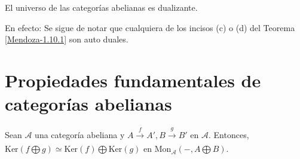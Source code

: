 \documentclass[tesis]{subfiles}
\begin{document}
\begin{Obs}\label{Mendoza-Ejer.48}
    El universo de las categorías abelianas es dualizante.
    \vspace{1mm}

    En efecto: Se sigue de notar que cualquiera de los incisos (c) o (d) del Teorema \ref{Mendoza-1.10.1} son auto duales.
\end{Obs}

\section{Propiedades fundamentales de categorías abelianas} \label{Sec: Propiedades fundamentales de categorías abelianas}

%
%

\begin{Lema}\label{Lema de "aditividad" del funtor Ker en categorías abelianas}
    Sean $\mathscr{A}$ una categoría abeliana y $A\xrightarrow[]{f}A', B\xrightarrow[]{g}B'$ en $\mathscr{A}$. Entonces, $\text{Ker}(f\bigoplus g) \simeq \text{Ker}(f)\bigoplus \text{Ker}(g)$ en $\text{Mon}_\mathscr{A}(-,A\bigoplus B)$.
\end{Lema}
\end{document}
